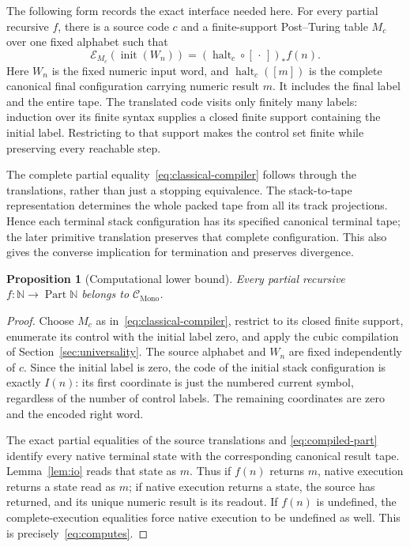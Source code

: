 \documentclass[11pt]{article}
\numberwithin{equation}{section}
\newtheorem{proposition}[theorem]{Proposition}
\theoremstyle{definition}
\theoremstyle{remark}
\newcommand{\N}{\mathbb N}
\newcommand{\Part}{\operatorname{Part}}
\begin{document}
The following form records the exact interface needed here. For every
partial recursive $f$, there is a source code $c$ and a finite-support
Post--Turing table $M_c$ over one fixed alphabet such that
\begin{equation}\label{eq:classical-compiler}
 \mathcal E_{M_c}(\operatorname{init}(W_n))
       =(\operatorname{halt}_c\circ[\,\cdot\,])_*f(n).
\end{equation}
Here $W_n$ is the fixed numeric input word, and
$\operatorname{halt}_c([m])$ is the complete canonical final
configuration carrying numeric result $m$. It includes the final
label and the entire tape. The translated code visits only finitely
many labels: induction over its finite syntax supplies a closed finite
support containing the initial label. Restricting to that support
makes the control set finite while preserving every reachable step.

The complete partial equality~\eqref{eq:classical-compiler} follows
through the translations, rather than just a stopping equivalence.
The stack-to-tape representation determines the whole packed tape
from all its track projections. Hence each terminal stack configuration
has its specified canonical terminal tape; the later primitive
translation preserves that complete configuration. This also gives
the converse implication for termination and preserves divergence.

\begin{proposition}[Computational lower bound]\label{prop:lower}
Every partial recursive $f:\N\to\Part\N$ belongs to
$\mathcal C_{\mathrm{Mono}}$.
\end{proposition}
\begin{proof}
Choose $M_c$ as in~\eqref{eq:classical-compiler}, restrict to its
closed finite support, enumerate its control with the initial label
zero, and apply the cubic compilation of Section~\ref{sec:universality}.
The source alphabet and $W_n$ are fixed independently of $c$.
Since the initial label is zero, the code of the initial stack
configuration is exactly $I(n)$: its first coordinate is just the
numbered current symbol, regardless of the number of control labels.
The remaining coordinates are zero and the encoded right word.

The exact partial equalities of the source translations and
\eqref{eq:compiled-part} identify every native terminal state with
the corresponding canonical result tape. Lemma~\ref{lem:io} reads
that state as $m$. Thus if $f(n)$ returns $m$, native execution returns
a state read as $m$; if native execution returns a state, the source
has returned, and its unique numeric result is its readout. If $f(n)$
is undefined, the complete-execution equalities force native execution
to be undefined as well. This is precisely~\eqref{eq:computes}.
\end{proof}
\end{document}
